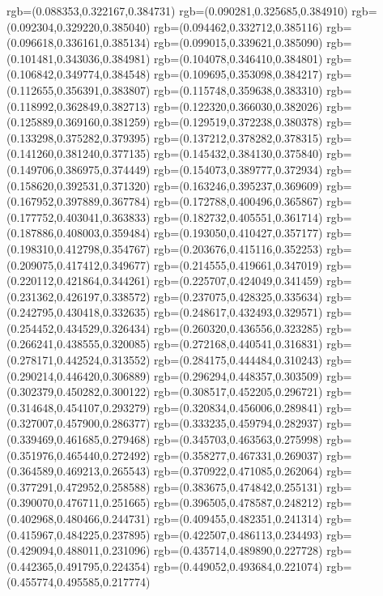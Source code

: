 {{{			rgb=(0.088353,0.322167,0.384731)
			rgb=(0.090281,0.325685,0.384910)
			rgb=(0.092304,0.329220,0.385040)
			rgb=(0.094462,0.332712,0.385116)
			rgb=(0.096618,0.336161,0.385134)
			rgb=(0.099015,0.339621,0.385090)
			rgb=(0.101481,0.343036,0.384981)
			rgb=(0.104078,0.346410,0.384801)
			rgb=(0.106842,0.349774,0.384548)
			rgb=(0.109695,0.353098,0.384217)
			rgb=(0.112655,0.356391,0.383807)
			rgb=(0.115748,0.359638,0.383310)
			rgb=(0.118992,0.362849,0.382713)
			rgb=(0.122320,0.366030,0.382026)
			rgb=(0.125889,0.369160,0.381259)
			rgb=(0.129519,0.372238,0.380378)
			rgb=(0.133298,0.375282,0.379395)
			rgb=(0.137212,0.378282,0.378315)
			rgb=(0.141260,0.381240,0.377135)
			rgb=(0.145432,0.384130,0.375840)
			rgb=(0.149706,0.386975,0.374449)
			rgb=(0.154073,0.389777,0.372934)
			rgb=(0.158620,0.392531,0.371320)
			rgb=(0.163246,0.395237,0.369609)
			rgb=(0.167952,0.397889,0.367784)
			rgb=(0.172788,0.400496,0.365867)
			rgb=(0.177752,0.403041,0.363833)
			rgb=(0.182732,0.405551,0.361714)
			rgb=(0.187886,0.408003,0.359484)
			rgb=(0.193050,0.410427,0.357177)
			rgb=(0.198310,0.412798,0.354767)
			rgb=(0.203676,0.415116,0.352253)
			rgb=(0.209075,0.417412,0.349677)
			rgb=(0.214555,0.419661,0.347019)
			rgb=(0.220112,0.421864,0.344261)
			rgb=(0.225707,0.424049,0.341459)
			rgb=(0.231362,0.426197,0.338572)
			rgb=(0.237075,0.428325,0.335634)
			rgb=(0.242795,0.430418,0.332635)
			rgb=(0.248617,0.432493,0.329571)
			rgb=(0.254452,0.434529,0.326434)
			rgb=(0.260320,0.436556,0.323285)
			rgb=(0.266241,0.438555,0.320085)
			rgb=(0.272168,0.440541,0.316831)
			rgb=(0.278171,0.442524,0.313552)
			rgb=(0.284175,0.444484,0.310243)
			rgb=(0.290214,0.446420,0.306889)
			rgb=(0.296294,0.448357,0.303509)
			rgb=(0.302379,0.450282,0.300122)
			rgb=(0.308517,0.452205,0.296721)
			rgb=(0.314648,0.454107,0.293279)
			rgb=(0.320834,0.456006,0.289841)
			rgb=(0.327007,0.457900,0.286377)
			rgb=(0.333235,0.459794,0.282937)
			rgb=(0.339469,0.461685,0.279468)
			rgb=(0.345703,0.463563,0.275998)
			rgb=(0.351976,0.465440,0.272492)
			rgb=(0.358277,0.467331,0.269037)
			rgb=(0.364589,0.469213,0.265543)
			rgb=(0.370922,0.471085,0.262064)
			rgb=(0.377291,0.472952,0.258588)
			rgb=(0.383675,0.474842,0.255131)
			rgb=(0.390070,0.476711,0.251665)
			rgb=(0.396505,0.478587,0.248212)
			rgb=(0.402968,0.480466,0.244731)
			rgb=(0.409455,0.482351,0.241314)
			rgb=(0.415967,0.484225,0.237895)
			rgb=(0.422507,0.486113,0.234493)
			rgb=(0.429094,0.488011,0.231096)
			rgb=(0.435714,0.489890,0.227728)
			rgb=(0.442365,0.491795,0.224354)
			rgb=(0.449052,0.493684,0.221074)
			rgb=(0.455774,0.495585,0.217774)
}}}
